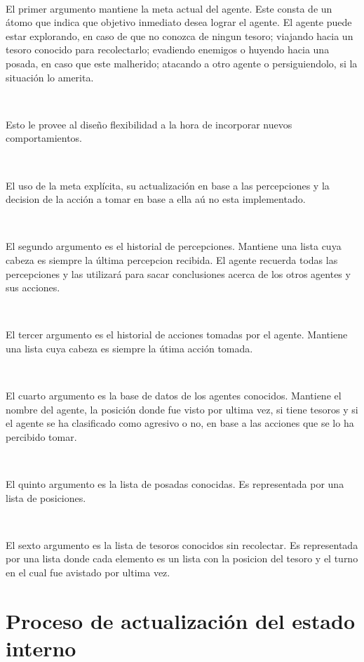 \documentclass[a4paper,12pt]{report}
\begin{document}
\ 

El primer argumento mantiene la meta actual del agente.
Este consta de un \'{a}tomo que indica que objetivo inmediato desea lograr el agente.
El agente puede estar explorando, en caso de que no conozca de ningun tesoro; viajando hacia un 
tesoro conocido para recolectarlo; evadiendo enemigos o huyendo hacia una posada, en caso que 
este malherido; atacando a otro agente o persiguiendolo, si la situaci\'{o}n lo amerita.

\ 

Esto le provee al dise\~{n}o flexibilidad a la hora de incorporar nuevos comportamientos.

\ 

El uso de la meta expl\'{i}cita, su actualizaci\'{o}n en base a las percepciones y la decision de
la acci\'{o}n a tomar en base a ella a\'{u} no esta implementado.

\ 

El segundo argumento es el historial de percepciones. Mantiene una lista cuya cabeza es siempre la 
\'{u}ltima percepcion recibida.
El agente recuerda todas las percepciones y las utilizar\'{a} para sacar conclusiones acerca de los 
otros agentes y sus acciones.

\ 

El tercer argumento es el historial de acciones tomadas por el agente. 
Mantiene una lista cuya cabeza es siempre la \'{u}tima acci\'{o}n tomada.  

\ 

El cuarto argumento es la base de datos de los agentes conocidos.
Mantiene el nombre del agente, la posici\'{o}n donde fue visto por ultima vez, si tiene tesoros y 
si el agente se ha clasificado como agresivo o no, en base a las acciones que se lo ha percibido 
tomar.

\ 

El quinto argumento es la lista de posadas conocidas. 
Es representada por una lista de posiciones.

\ 

El sexto argumento es la lista de tesoros conocidos sin recolectar.
Es representada por una lista donde cada elemento es un lista con la posicion del tesoro y el 
turno en el cual fue avistado por ultima vez. 

\section{Proceso de actualizaci\'{o}n del estado interno}
\end{document}
